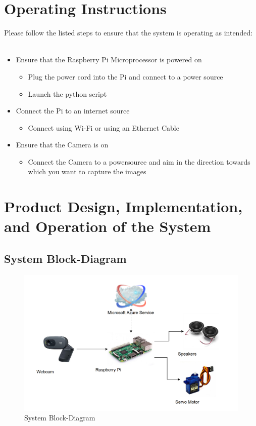\documentclass[a4paper,12pt]{article}
\begin{document}
\newpage
\section{Operating Instructions}

Please follow the listed steps to ensure that the system is operating as intended:
\\
\\


\begin{itemize}
    \item Ensure that the Raspberry Pi Microprocessor is powered on
    \begin{itemize}
        \item Plug the power cord into the Pi and connect to a power source
        \item Launch the python script
    \end{itemize}
    \item Connect the Pi to an internet source
    \begin{itemize}
        \item Connect using Wi-Fi or using an Ethernet Cable
    \end{itemize}
    \item Ensure that the Camera is on
    \begin{itemize}
        \item Connect the Camera to a powersource and aim in the direction towards which you want to capture the images
    \end{itemize}
\end{itemize}


\section{Product Design, Implementation, and Operation of the System}

\subsection{System Block-Diagram}
\begin{figure}[ht]
    \centering
    \includegraphics[width = \linewidth]{../images/BlockDiagram.png}
    
    \caption{System Block-Diagram}
\end{figure}
\end{document}
